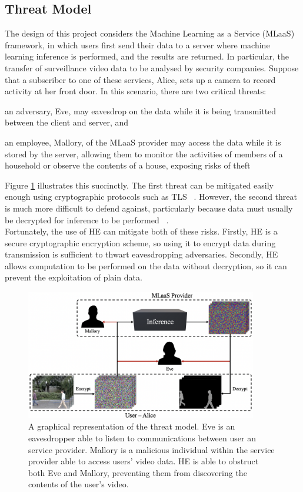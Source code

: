 \subsection{Threat Model}
\label{sec:threatModel}
\setlength{\leftskip}{0.5cm}
\indent \indent
The design of this project considers the Machine Learning as a Service (MLaaS) framework, in which users first send their data to a server where machine learning inference is performed, and the results are returned. In particular, the transfer of surveillance video data to be analysed by security companies. Suppose that a subscriber to one of these services, Alice, sets up a camera to record activity at her front door. In this scenario, there are two critical threats: 
\begin{enumerate*}[label=$(\roman*)$]
    \item an adversary, Eve, may eavesdrop on the data while it is being transmitted between the client and server, and 
    \item an employee, Mallory, of the MLaaS provider may access the data while it is stored by the server, allowing them to monitor the activities of members of a household or observe the contents of a house, exposing risks of theft
\end{enumerate*}
Figure \ref{fig:threatModel} illustrates this succinctly. The first threat can be mitigated easily enough using cryptographic protocols such as TLS ~\cite{TLS}. However, the second threat is much more difficult to defend against, particularly because data must usually be decrypted for inference to be performed ~\cite{Bae}.
\smallskip \\ \indent
Fortunately, the use of HE can mitigate both of these risks. Firstly, HE is a secure cryptographic encryption scheme, so using it to encrypt data during transmission is sufficient to thwart eavesdropping adversaries. Secondly, HE allows computation to be performed on the data without decryption, so it can prevent the exploitation of plain data.

\begin{figure}[ht]
    \centering
    \includegraphics[width=0.9\textwidth]{figures/threatModel}
    \caption[The Threat Model]{A graphical representation of the threat model. Eve is an eavesdropper able to listen to communications between user an service provider. Mallory is a malicious individual within the service provider able to access users' video data. HE is able to obstruct both Eve and Mallory, preventing them from discovering the contents of the user's video.}
    \label{fig:threatModel}
\end{figure}

